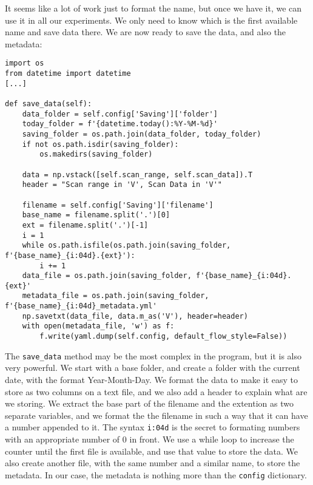 It seems like a lot of work just to format the name, but once we have it, we can use it in all our experiments. We only need to know which is the first available name and save data there. We are now ready to save the data, and also the metadata:

\begin{verbatim}
import os
from datetime import datetime
[...]

def save_data(self):
    data_folder = self.config['Saving']['folder']
    today_folder = f'{datetime.today():%Y-%M-%d}'
    saving_folder = os.path.join(data_folder, today_folder)
    if not os.path.isdir(saving_folder):
        os.makedirs(saving_folder)

    data = np.vstack([self.scan_range, self.scan_data]).T
    header = "Scan range in 'V', Scan Data in 'V'"

    filename = self.config['Saving']['filename']
    base_name = filename.split('.')[0]
    ext = filename.split('.')[-1]
    i = 1
    while os.path.isfile(os.path.join(saving_folder, f'{base_name}_{i:04d}.{ext}'):
        i += 1
    data_file = os.path.join(saving_folder, f'{base_name}_{i:04d}.{ext}'
    metadata_file = os.path.join(saving_folder, f'{base_name}_{i:04d}_metadata.yml'
    np.savetxt(data_file, data.m_as('V'), header=header)
    with open(metadata_file, 'w') as f:
        f.write(yaml.dump(self.config, default_flow_style=False))
\end{verbatim}

The \texttt{save\_data} method may be the most complex in the program, but it is also very powerful. We start with a base folder, and create a folder with the current date, with the format Year-Month-Day. We format the data to make it easy to store as two columns on a text file, and we also add a header to explain what are we storing. We extract the base part of the filename and the extention as two separate variables, and we format the the filename in such a way that it can have a number appended to it. The syntax \texttt{i:04d} is the secret to formating numbers with an appropriate number of $0$ in front. We use a while loop to increase the counter until the first file is available, and use that value to store the data. We also create another file, with the same number and a similar name, to store the metadata. In our case, the metadata is nothing more than the \texttt{config} dictionary.


